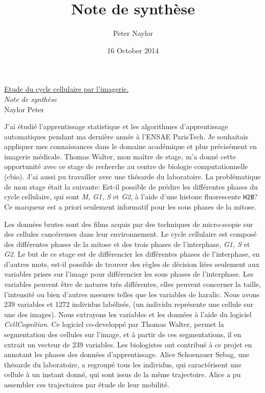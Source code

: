 \documentclass{article}
\title{Note de synthèse}
\author{Peter Naylor}
\date{16 October 2014}
\begin{document}
\begin{center}
\begin{Large}\underline{Etude du cycle cellulaire par l'imagerie.}
\\
\vspace{0.3cm}
\textit{Note de synthèse} \\
Naylor Peter
\end{Large}
\end{center}

J'ai étudié l'apprentissage statistique et les algorithmes d'apprentissage automatiques pendant ma dernière année à l'ENSAE ParisTech. Je souhaitais appliquer mes connaissances dans le domaine académique et plus précisément en imagerie médicale. Thomas Walter, mon maître de stage, m'a donné cette opportunité avec ce stage de recherche au centre de biologie computationnelle (cbio). J'ai aussi pu travailler avec une thésarde du laboratoire. La problématique de mon stage était la suivante: Est-il possible de prédire les différentes phases du cycle cellulaire, qui sont \textit{M, G1, S} et \textit{G2}, à l'aide d'une histone fluorescente \texttt{H2B}? Ce marqueur est a priori seulement informatif pour les sous phases de la mitose.

\bigskip

Les données brutes sont des films acquis par des techniques de micro-scopie sur des cellules cancéreuses dans leur environnement. Le cycle cellulaire est composé des différentes phases de la mitose et des trois phases de l'interphase, \textit{G1, S} et \textit{G2}. Le but de ce stage est de différencier les différentes phases de l'interphase, en d'autres mots, est-il possible de trouver des règles de décision liées seulement aux variables prises sur l'image pour différencier les sous phases de l'interphase. Les variables peuvent être de natures très différentes, elles peuvent concerner la taille, l'intensité ou bien d'autres mesures telles que les variables de haralic. Nous avons 239 variables et 1272 individus labélisés, (un individu représente une cellule sur une des images). Nous extrayons les variables et les données à l'aide du logiciel \textit{CellCognition}. Ce logiciel co-developpé par Thomas Walter, permet la segmentation des cellules sur l'image, et à partir de ces segmentations, il en extrait un vecteur de 239 variables. Les biologistes ont contribué à ce projet en annotant les phases des données d'apprentissage. Alice Schoenauer Sebag, une thésarde du laboratoire, a regroupé tous les individus, qui caractérisent une cellule à un instant donné, qui sont issus de la même trajectoire. Alice a pu assembler ces trajectoires par étude de leur mobilité.
\end{document}
